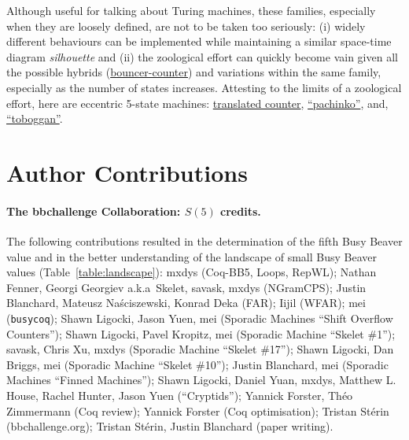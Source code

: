 \documentclass[a4paper,british]{article}
\theoremstyle{definition} %
\numberwithin{equation}{section}
\theoremstyle{definition} %
\newcommand{\CoqBB}{Coq-BB5\xspace}
\begin{document}
Although useful for talking about Turing machines, these families, especially when they are loosely defined, are not to be taken too seriously: (i) widely different behaviours can be implemented while maintaining a similar space-time diagram \textit{silhouette} and (ii) the zoological effort can quickly become vain given all the possible hybrids (\eg \href{https://bbchallenge.org/1RB---_1LC1RE_0RD0LC_1LB1LA_0RA1RE}{bouncer-counter}) and variations within the same family, especially as the number of states increases. Attesting to the limits of a zoological effort, here are eccentric 5-state machines: \href{https://bbchallenge.org/1RB0RA_1LC0LD_1RE1RD_1LA1LB_---1RC}{translated counter}, \href{https://bbchallenge.org/1RB0RD_1LC1LB_1RA0LB_0RE1RD_---1RA}{``pachinko''}, and, \href{https://bbchallenge.org/1RB0RC_0LC---_1RD1RC_0LE1RA_1RD1LE}{``toboggan''}.








\appendix
\newpage
\section{Author Contributions}\label{app:contribs}

\paragraph{The bbchallenge Collaboration: $S(5)$ credits.} The following contributions resulted in the determination of the fifth Busy Beaver value and in the better understanding of the landscape of small Busy Beaver values (Table~\ref{table:landscape}): mxdys (\CoqBB, Loops, RepWL); Nathan Fenner, Georgi Georgiev a.k.a~Skelet, savask, mxdys (NGramCPS); Justin Blanchard, Mateusz Naściszewski, Konrad Deka (FAR); Iijil (WFAR); mei (\texttt{busycoq}); Shawn Ligocki, Jason Yuen, mei (Sporadic Machines ``Shift Overflow Counters''); Shawn Ligocki, Pavel Kropitz, mei (Sporadic Machine ``Skelet \#1''); savask, Chris Xu, mxdys (Sporadic Machine ``Skelet \#17''); Shawn Ligocki, Dan Briggs, mei (Sporadic Machine ``Skelet \#10''); Justin Blanchard, mei (Sporadic Machines ``Finned Machines''); Shawn Ligocki, Daniel Yuan, mxdys, Matthew L. House, Rachel Hunter, Jason Yuen (``Cryptids''); Yannick Forster, Théo Zimmermann (Coq review); Yannick Forster (Coq optimisation); Tristan Stérin (bbchallenge.org); Tristan Stérin, Justin Blanchard (paper writing).
\end{document}
